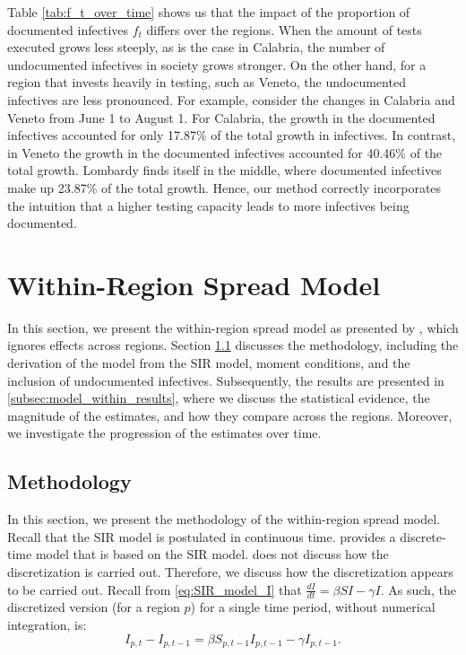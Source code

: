 \documentclass[12pt]{article}
\begin{document}
	Table \ref{tab:f_t_over_time} shows us that the impact of the proportion of documented infectives $f_t$ differs over the regions. When the amount of tests executed grows less steeply, as is the case in Calabria, the number of undocumented infectives in society grows stronger. On the other hand, for a region that invests heavily in testing, such as Veneto, the undocumented infectives are less pronounced. For example, consider the changes in Calabria and Veneto from June 1 to August 1. For Calabria, the growth in the documented infectives accounted for only 17.87\% of the total growth in infectives. In contrast, in Veneto the growth in the documented infectives accounted for 40.46\% of the total growth. Lombardy finds itself in the middle, where documented infectives make up 23.87\% of the total growth. Hence, our method correctly incorporates the intuition that a higher testing capacity leads to more infectives being documented.
	
	\section{Within-Region Spread Model} \label{sec:model_within}
	In this section, we present the within-region spread model as presented by \textcite{adda2016economic}, which ignores effects across regions. Section \ref{subsec:model_within_methodology} discusses the methodology, including the derivation of the model from the SIR model, moment conditions, and the inclusion of undocumented infectives. Subsequently, the results are presented in \ref{subsec:model_within_results}, where we discuss the statistical evidence, the magnitude of the estimates, and how they compare across the regions. Moreover, we investigate the progression of the estimates over time.
	
	\subsection{Methodology} \label{subsec:model_within_methodology}
	In this section, we present the methodology of the within-region spread model. Recall that the SIR model is postulated in continuous time. \textcite{adda2016economic} provides a discrete-time model that is based on the SIR model. \textcite{adda2016economic} does not discuss how the discretization is carried out. Therefore, we discuss how the discretization appears to be carried out. Recall from \eqref{eq:SIR_model_I} that $\frac{dI}{dt} = \beta SI - \gamma I$. As such, the discretized version (for a region $p$) for a single time period, without numerical integration, is:
	    \begin{equation}\label{eq:discretized_sir}
	        I_{p,t} - I_{p,t-1} = \beta S_{p,t-1}I_{p,t-1} - \gamma I_{p,t-1}.
	    \end{equation}
	   
\end{document}
